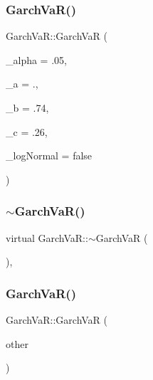 \subsubsection{\texorpdfstring{Garch\+Va\+R()}{GarchVaR()}\hspace{0.1cm}{\footnotesize\ttfamily [1/2]}}
{\footnotesize\ttfamily Garch\+Va\+R\+::\+Garch\+VaR (\begin{DoxyParamCaption}\item[{double}]{\+\_\+alpha = {\ttfamily .05},  }\item[{double}]{\+\_\+a = {.},  }\item[{double}]{\+\_\+b = {\ttfamily .74},  }\item[{double}]{\+\_\+c = {\ttfamily .26},  }\item[{bool}]{\+\_\+log\+Normal = {\ttfamily false} }\end{DoxyParamCaption})}

\hypertarget{classGarchVaR_aa95d7d35fad664439c72013528b6f7e1}{}\label{classGarchVaR_aa95d7d35fad664439c72013528b6f7e1} 
\subsubsection{\texorpdfstring{$\sim$\+Garch\+Va\+R()}{~GarchVaR()}}
{\footnotesize\ttfamily virtual Garch\+Va\+R\+::$\sim$\+Garch\+VaR (\begin{DoxyParamCaption}{ }\end{DoxyParamCaption})\hspace{0.3cm}{\ttfamily [inline]}, {\ttfamily [virtual]}}

\hypertarget{classGarchVaR_a5a8f06045676f3e8776bf49f08bea635}{}\label{classGarchVaR_a5a8f06045676f3e8776bf49f08bea635} 
\subsubsection{\texorpdfstring{Garch\+Va\+R()}{GarchVaR()}\hspace{0.1cm}{\footnotesize\ttfamily [2/2]}}
{\footnotesize\ttfamily Garch\+Va\+R\+::\+Garch\+VaR (\begin{DoxyParamCaption}\item[{const \hyperlink{classGarchVaR}{Garch\+VaR} \&}]{other }\end{DoxyParamCaption})}



